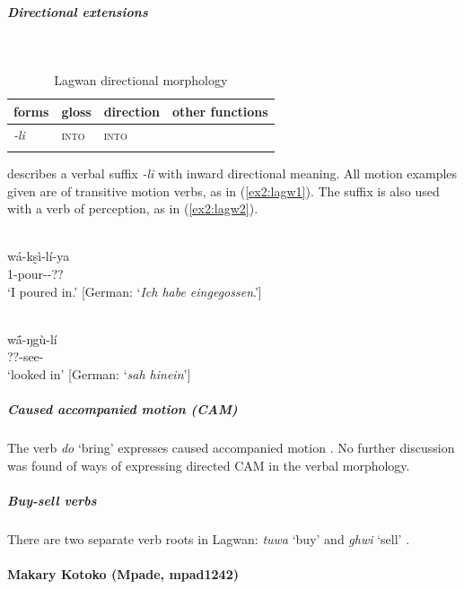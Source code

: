 \newpage
\subparagraph{Directional extensions}~

\begin{table}[H]
	\caption{Lagwan directional morphology}
	\label{tab:lagw}
	\begin{tabular}{llll} %
		\lsptoprule
		forms & gloss & direction  & other functions  \\ %
		\midrule
		\textit{-li}  &  \textsc{into}  &  \textsc{into} &    \\
		\lspbottomrule
	\end{tabular}
\end{table} 

\citet[49--50]{lukasLogoneSpracheImZentralen1936} describes a verbal suffix \textit{-li} with inward directional meaning. All motion examples given are of transitive motion verbs, as in (\ref{ex2:lagw1}). The suffix is also used with a verb of perception, as in (\ref{ex2:lagw2}). 

\ea\label{ex2:lagw1}
 \\
\gll wá-ks̰ì-lí-ya \\
1-pour--??	\\
\glt `I poured in.' [German: `\textit{Ich habe eingegossen}.']

\ex\label{ex2:lagw2}
 \\
\gll wā́-ŋgù-lí \\
??-see-	\\
\glt `looked in' [German: `\textit{sah hinein}']
\z 

\subparagraph{Caused accompanied motion (CAM)}

The verb \textit{do} `bring' expresses caused accompanied motion \citep{shryockLagwanFrenchEnglish2020}. No further discussion was found of ways of expressing directed CAM in the verbal morphology. 

\subparagraph{Buy-sell verbs}

There are two separate verb roots in Lagwan: \textit{tuwa} `buy' and \textit{ghwi} `sell' \citep{shryockLagwanFrenchEnglish2020}.

\paragraph*{Makary Kotoko (Mpade, mpad1242)} \label{maka}

